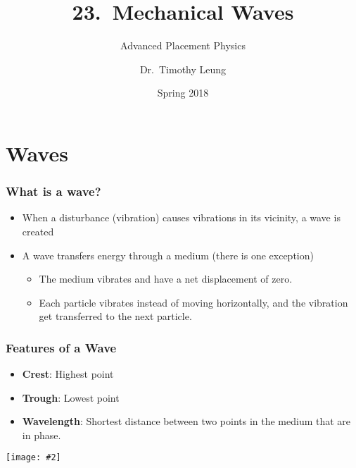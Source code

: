 \documentclass[12pt,aspectratio=169]{beamer}
\title[Waves]{23.\ Mechanical Waves}
\subtitle{Advanced Placement Physics}
\author[TML]{Dr.\ Timothy Leung}
\institute{Olympiads School}
\date{Spring 2018}
\newcommand{\pic}[2]{\texttt{[image: \#2]}}
\begin{document}
\begin{frame}
  \titlepage
\end{frame}



\section{Waves}
\begin{frame}
  \frametitle{What is a wave?}
  \begin{itemize}
  \item When a disturbance (vibration) causes vibrations in its vicinity, a
    wave is created
  \item A wave transfers energy through a medium (there is one exception)
    \begin{itemize}
    \item The medium vibrates and have a net displacement of zero.
    \item Each particle vibrates instead of moving horizontally, and the
      vibration get transferred to the next particle.
    \end{itemize}
  \end{itemize}
\end{frame}



\begin{frame}
  \frametitle{Features of a Wave}
  \begin{itemize}
  \item\textbf{Crest}: Highest point
  \item\textbf{Trough}: Lowest point
  \item\textbf{Wavelength}: Shortest distance between two points in the medium
    that are in phase.
  \end{itemize}
  \begin{center}
    \vspace{-.5in}
    \pic{.8}{sine-wave1.png}
  \end{center}
  
  \vspace{-.3in}{\footnotesize(The easiest way to measure wavelength is from
    crest to crest, or from trough to trough.)\par}
\end{frame}
\end{document}
